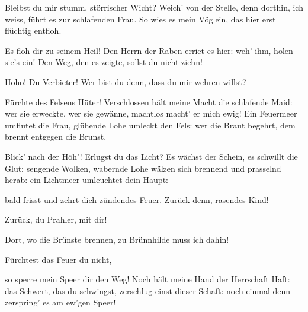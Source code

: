 \begin{drama}
\Siegfriedspeaks

Bleibst du mir stumm,
störrischer Wicht?
Weich' von der Stelle,
denn dorthin, ich weiss,
führt es zur schlafenden Frau.
So wies es mein Vöglein,
das hier erst flüchtig entfloh.


\Wandererspeaks


Es floh dir zu seinem Heil!
Den Herrn der Raben
erriet es hier:
weh' ihm, holen sie's ein!
Den Weg, den es zeigte,
sollst du nicht ziehn!

\Siegfriedspeaks


Hoho! Du Verbieter!
Wer bist du denn,
dass du mir wehren willst?

\Wandererspeaks

Fürchte des Felsens Hüter!
Verschlossen hält
meine Macht die schlafende Maid:
wer sie erweckte,
wer sie gewänne,
machtlos macht' er mich ewig!
Ein Feuermeer
umflutet die Frau,
glühende Lohe
umleckt den Fels:
wer die Braut begehrt,
dem brennt entgegen die Brunst.


Blick' nach der Höh'!
Erlugst du das Licht?
Es wächst der Schein,
es schwillt die Glut;
sengende Wolken,
wabernde Lohe
wälzen sich brennend
und prasselnd herab:
ein Lichtmeer
umleuchtet dein Haupt:


bald frisst und zehrt dich
zündendes Feuer.
Zurück denn, rasendes Kind!

\Siegfriedspeaks

Zurück, du Prahler, mit dir!


Dort, wo die Brünste brennen,
zu Brünnhilde muss ich dahin!

\Wandererspeaks

Fürchtest das Feuer du nicht,


so sperre mein Speer dir den Weg!
Noch hält meine Hand
der Herrschaft Haft:
das Schwert, das du schwingst,
zerschlug einst dieser Schaft:
noch einmal denn
zerspring' es am ew'gen Speer!


\end{drama}
